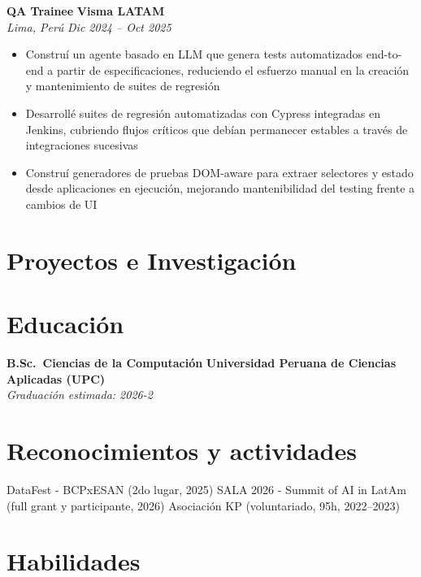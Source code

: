 \documentclass[a4paper,10pt]{article}
\providecommand{\projectssectionfile}{sections/projects.es.tex}
\begin{document}
\vspace{2pt}

\textbf{QA Trainee} \hfill \textbf{Visma LATAM}\\
\textit{Lima, Perú} \hfill \textit{Dic 2024 -- Oct 2025}
\begin{itemize}[leftmargin=1.2em, itemsep=1pt, topsep=2pt]
  \item Construí un agente basado en LLM que genera tests automatizados end-to-end a partir de especificaciones, reduciendo el esfuerzo manual en la creación y mantenimiento de suites de regresión
  \item Desarrollé suites de regresión automatizadas con Cypress integradas en Jenkins, cubriendo flujos críticos que debían permanecer estables a través de integraciones sucesivas
  \item Construí generadores de pruebas DOM-aware para extraer selectores y estado desde aplicaciones en ejecución, mejorando mantenibilidad del testing frente a cambios de UI
\end{itemize}

\section*{Proyectos e Investigación}


\section*{Educación}

\textbf{B.Sc.\ Ciencias de la Computación} \hfill \textbf{Universidad Peruana de Ciencias Aplicadas (UPC)}\\
\textit{Graduación estimada: 2026-2}

\section*{Reconocimientos y actividades}

DataFest - BCPxESAN (2do lugar, 2025) \textperiodcentered{}
SALA 2026 - Summit of AI in LatAm (full grant y participante, 2026) \textperiodcentered{}
Asociación KP (voluntariado, 95h, 2022--2023)

\section*{Habilidades}
\end{document}

